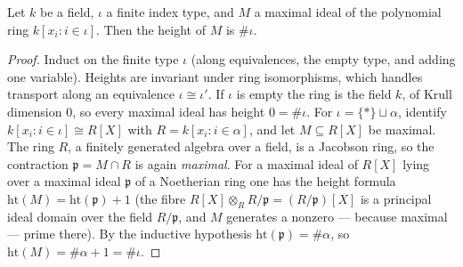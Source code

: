 \begin{theorem}
  \label{pa-thm:mvpoly_maximal_height}
  \leanok

  Let \(k\) be a field, \(\iota\) a finite index type, and \(M\) a maximal ideal of the
  polynomial ring \(k[x_i : i \in \iota]\). Then the height of \(M\) is \(\#\iota\).
\end{theorem}
\begin{proof}
  \leanok
  Induct on the finite type \(\iota\) (along equivalences, the empty type, and adding
  one variable). Heights are invariant under ring isomorphisms, which handles transport
  along an equivalence \(\iota \cong \iota'\). If \(\iota\) is empty the ring is the
  field \(k\), of Krull dimension \(0\), so every maximal ideal has height \(0 =
  \#\iota\). For \(\iota = \{*\} \sqcup \alpha\), identify
  \(k[x_i : i \in \iota] \cong R[X]\) with \(R = k[x_i : i \in \alpha]\), and let
  \(M \subseteq R[X]\) be maximal. The ring \(R\), a finitely generated algebra over a
  field, is a Jacobson ring, so the contraction \(\mathfrak p = M \cap R\) is again
  \emph{maximal}. For a maximal ideal of \(R[X]\) lying over a maximal ideal
  \(\mathfrak p\) of a Noetherian ring one has the height formula
  \(\mathrm{ht}(M) = \mathrm{ht}(\mathfrak p) + 1\) (the fibre
  \(R[X] \otimes_R R/\mathfrak p = (R/\mathfrak p)[X]\) is a principal ideal domain over
  the field \(R/\mathfrak p\), and \(M\) generates a nonzero --- because maximal ---
  prime there). By the inductive hypothesis \(\mathrm{ht}(\mathfrak p) = \#\alpha\), so
  \(\mathrm{ht}(M) = \#\alpha + 1 = \#\iota\).
\end{proof}

